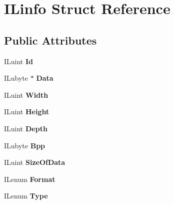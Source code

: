 \hypertarget{struct_i_linfo}{\section{I\+Linfo Struct Reference}
\label{struct_i_linfo}
}
\subsection*{Public Attributes}
\begin{DoxyCompactItemize}
\item 
\hypertarget{struct_i_linfo_ad7897159f2327bc2a319087c373086db}{I\+Luint {\bfseries Id}}\label{struct_i_linfo_ad7897159f2327bc2a319087c373086db}

\item 
\hypertarget{struct_i_linfo_a7fb653f278716b32e95fbd6435975436}{I\+Lubyte $\ast$ {\bfseries Data}}\label{struct_i_linfo_a7fb653f278716b32e95fbd6435975436}

\item 
\hypertarget{struct_i_linfo_a7b95a84136103daf4ee35c7fd72b8117}{I\+Luint {\bfseries Width}}\label{struct_i_linfo_a7b95a84136103daf4ee35c7fd72b8117}

\item 
\hypertarget{struct_i_linfo_aa3bd30c9f9882e3c97a0a95af4609558}{I\+Luint {\bfseries Height}}\label{struct_i_linfo_aa3bd30c9f9882e3c97a0a95af4609558}

\item 
\hypertarget{struct_i_linfo_aa563678d24ee6d994d6a91823b5ff3aa}{I\+Luint {\bfseries Depth}}\label{struct_i_linfo_aa563678d24ee6d994d6a91823b5ff3aa}

\item 
\hypertarget{struct_i_linfo_a889805b301c732475ed50a78e643a67e}{I\+Lubyte {\bfseries Bpp}}\label{struct_i_linfo_a889805b301c732475ed50a78e643a67e}

\item 
\hypertarget{struct_i_linfo_afee15ab4c442646a428ea11adbad0d4a}{I\+Luint {\bfseries Size\+Of\+Data}}\label{struct_i_linfo_afee15ab4c442646a428ea11adbad0d4a}

\item 
\hypertarget{struct_i_linfo_aee02af2d876001643be54e700169e574}{I\+Lenum {\bfseries Format}}\label{struct_i_linfo_aee02af2d876001643be54e700169e574}

\item 
\hypertarget{struct_i_linfo_ab3f105dee24a40dce85616b4d2562eb1}{I\+Lenum {\bfseries Type}}\label{struct_i_linfo_ab3f105dee24a40dce85616b4d2562eb1}


\end{DoxyCompactItemize}
